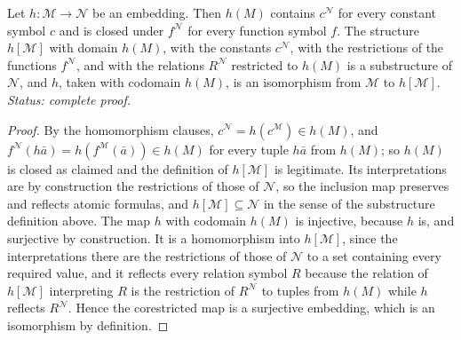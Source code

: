 \begin{lemma}
\label{lem:embedding-image}
Let \(h:\mathcal M\to\mathcal N\) be an embedding.  Then \(h(M)\)
contains \(c^{\mathcal N}\) for every constant symbol \(c\) and is closed
under \(f^{\mathcal N}\) for every function symbol \(f\).  The structure
\(h[\mathcal M]\) with domain \(h(M)\), with the constants
\(c^{\mathcal N}\), with the restrictions of the functions
\(f^{\mathcal N}\), and with the relations \(R^{\mathcal N}\) restricted
to \(h(M)\) is a substructure of \(\mathcal N\), and \(h\), taken with
codomain \(h(M)\), is an isomorphism from \(\mathcal M\) to
\(h[\mathcal M]\).
\textit{Status: complete proof.}
\end{lemma}
\begin{proof}
By the homomorphism clauses,
\(c^{\mathcal N}=h(c^{\mathcal M})\in h(M)\), and
\(f^{\mathcal N}(h\bar a)=h(f^{\mathcal M}(\bar a))\in h(M)\) for every
tuple \(h\bar a\) from \(h(M)\); so \(h(M)\) is closed as claimed and the
definition of \(h[\mathcal M]\) is legitimate.  Its interpretations are by
construction the restrictions of those of \(\mathcal N\), so the
inclusion map preserves and reflects atomic formulas, and
\(h[\mathcal M]\subseteq\mathcal N\) in the sense of the substructure
definition above.  The map \(h\) with codomain \(h(M)\) is injective,
because \(h\) is, and surjective by construction.  It is a homomorphism
into \(h[\mathcal M]\), since the interpretations there are the
restrictions of those of \(\mathcal N\) to a set containing every
required value, and it reflects every relation symbol \(R\) because the
relation of \(h[\mathcal M]\) interpreting \(R\) is the restriction of
\(R^{\mathcal N}\) to tuples from \(h(M)\) while \(h\) reflects
\(R^{\mathcal N}\).  Hence the corestricted map is a surjective
embedding, which is an isomorphism by definition.
\end{proof}


